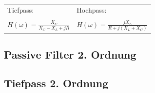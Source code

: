 		\begin{emphbox}
	
			\begin{tabular}{l|l}
				Tiefpass: & Hochpass: \\
				 & 
				 \\
				$ H(\omega) = \frac{X_C}{X_C - X_L +jR} $ &
				$ H(\omega) = \frac{jX_L}{R+j(X_L + X_C)} $
			\end{tabular}
		\end{emphbox}

\subsection{Passive Filter 2. Ordnung}

\subsection{Tiefpass 2. Ordnung}